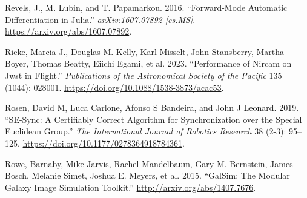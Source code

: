 \documentclass[10pt,a4paper,onecolumn]{article}
\begin{document}
\begin{cslreferences}
\leavevmode\hypertarget{ref-RevelsLubinPapamarkou2016}{}%
Revels, J., M. Lubin, and T. Papamarkou. 2016. ``Forward-Mode Automatic
Differentiation in Julia.'' \emph{arXiv:1607.07892 {[}cs.MS{]}}.
\url{https://arxiv.org/abs/1607.07892}.

\leavevmode\hypertarget{ref-Rieke_2023}{}%
Rieke, Marcia J., Douglas M. Kelly, Karl Misselt, John Stansberry,
Martha Boyer, Thomas Beatty, Eiichi Egami, et al. 2023. ``Performance of
Nircam on Jwst in Flight.'' \emph{Publications of the Astronomical
Society of the Pacific} 135 (1044): 028001.
\url{https://doi.org/10.1088/1538-3873/acac53}.

\leavevmode\hypertarget{ref-doi:10.1177ux2f0278364918784361}{}%
Rosen, David M, Luca Carlone, Afonso S Bandeira, and John J Leonard.
2019. ``SE-Sync: A Certifiably Correct Algorithm for Synchronization
over the Special Euclidean Group.'' \emph{The International Journal of
Robotics Research} 38 (2-3): 95--125.
\url{https://doi.org/10.1177/0278364918784361}.

\leavevmode\hypertarget{ref-rowe2015galsim}{}%
Rowe, Barnaby, Mike Jarvis, Rachel Mandelbaum, Gary M. Bernstein, James
Bosch, Melanie Simet, Joshua E. Meyers, et al. 2015. ``GalSim: The
Modular Galaxy Image Simulation Toolkit.''
\url{http://arxiv.org/abs/1407.7676}.
\end{cslreferences}
\end{document}

